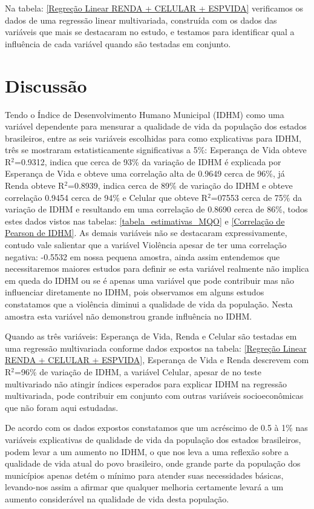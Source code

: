 \documentclass[journal]{IEEEtran}
\begin{document}
Na tabela: \ref{Regreção Linear RENDA + CELULAR + ESPVIDA} verificamos os dados de uma regressão linear multivariada, construída com os dados das variáveis que mais se destacaram no estudo, e testamos para identificar qual a influência de cada variável quando são testadas em conjunto.

\section{Discussão}

Tendo o Índice de Desenvolvimento Humano Municipal (IDHM) como uma variável dependente para mensurar a qualidade de vida da população dos estados brasileiros, entre as seis variáveis escolhidas para como explicativas para IDHM, três se mostraram estatisticamente significativas a 5\%: Esperança de Vida obteve R$^2$=0.9312, indica que cerca de 93\% da variação de IDHM é explicada por Esperança de Vida e obteve uma correlação alta de 0.9649 cerca de 96\%, já Renda obteve R$^2$=0.8939, indica cerca de 89\% de variação do IDHM e obteve correlação 0.9454 cerca de 94\% e Celular que obteve R$^2$=07553 cerca de 75\% da variação de IDHM e resultando em uma correlação de 0.8690 cerca de 86\%, todos estes dados vistos nas tabelas: \ref{tabela_estimativas_MQO} e \ref{Correlação de Pearson de IDHM}.
As demais variáveis não se destacaram expressivamente, contudo vale salientar que a variável Violência apesar de ter uma correlação negativa: -0.5532 em nossa pequena amostra, ainda assim entendemos que necessitaremos maiores estudos para definir se esta variável realmente não implica em queda do IDHM ou se é apenas uma variável que pode contribuir mas não influenciar diretamente no IDHM, pois observamos em alguns estudos\cite{Ferreira2015}\cite{Cruz2016}\cite{Luciana2007}\cite{loureiroimpacto} constatamos que a violência diminui a qualidade de vida da população. Nesta amostra esta variável não demonstrou grande influência no IDHM.

Quando as três variáveis: Esperança de Vida, Renda e Celular são testadas em uma regressão multivariada conforme dados expostos na tabela: \ref{Regreção Linear RENDA + CELULAR + ESPVIDA}, Esperança de Vida e Renda descrevem com R$^2$=96\% de variação de IDHM, a variável Celular, apesar de no teste multivariado não atingir índices esperados para explicar IDHM na regressão multivariada, pode contribuir em conjunto com outras variáveis socioeconômicas que não foram aqui estudadas.

De acordo com os dados expostos constatamos que um acréscimo de 0.5 à 1\% nas variáveis explicativas de qualidade de vida da população dos estados brasileiros, podem levar a um aumento no IDHM, o que nos leva a uma reflexão sobre a qualidade de vida atual do povo brasileiro, onde grande parte da população dos municípios apenas detém o mínimo para atender suas necessidades básicas, levando-nos assim a afirmar que qualquer melhoria certamente levará a um aumento considerável na qualidade de vida desta população.

\ifCLASSOPTIONcaptionsoff
  \newpage
\fi



\end{document}
